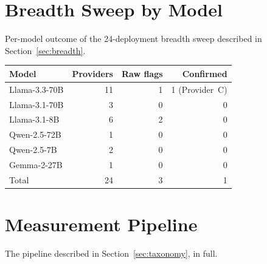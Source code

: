 \documentclass[11pt]{article}
\begin{document}
\section{Breadth Sweep by Model}
\label{app:breadth}

Per-model outcome of the 24-deployment breadth sweep described in
Section~\ref{sec:breadth}.

\begin{center}
\small
\begin{tabular}{lrrr}
\toprule
\textbf{Model} & \textbf{Providers} & \textbf{Raw flags} & \textbf{Confirmed} \\
\midrule
Llama-3.3-70B & 11 & 1 & 1 (Provider~C) \\
Llama-3.1-70B & 3  & 0 & 0 \\
Llama-3.1-8B  & 6  & 2 & 0 \\
Qwen-2.5-72B  & 1  & 0 & 0 \\
Qwen-2.5-7B   & 2  & 0 & 0 \\
Gemma-2-27B   & 1  & 0 & 0 \\
\midrule
Total         & 24 & 3 & 1 \\
\bottomrule
\end{tabular}
\label{tab:breadth}
\end{center}


\section{Measurement Pipeline}
\label{app:pipeline}

The pipeline described in Section~\ref{sec:taxonomy}, in full.
\end{document}
